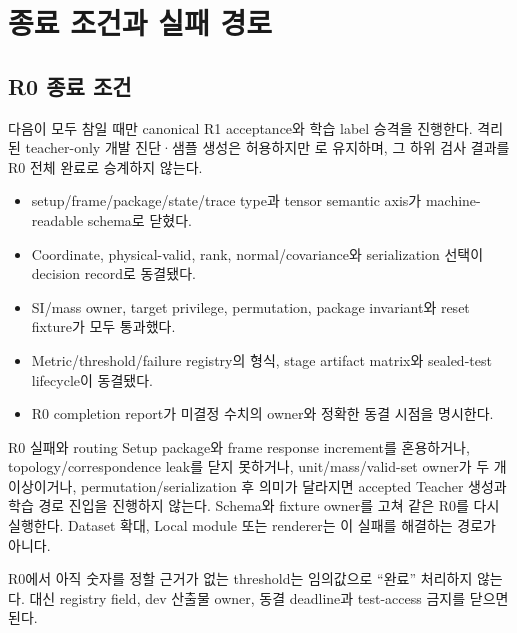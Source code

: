 \documentclass[10pt]{article}
\begin{document}
\section{종료 조건과 실패 경로}
\label{sec:r0-chapter-8}

\subsection{R0 종료 조건}

다음이 모두 참일 때만 canonical R1 acceptance와 학습 label 승격을 진행한다.
격리된 teacher-only 개발 진단·샘플 생성은 허용하지만 로 유지하며,
그 하위 검사 결과를 R0 전체 완료로 승계하지 않는다.
\begin{itemize}
  \item[$\square$] setup/frame/package/state/trace type과 tensor semantic axis가 machine-readable schema로 닫혔다.
  \item[$\square$] Coordinate, physical-valid, rank, normal/covariance와 serialization 선택이 decision record로 동결됐다.
  \item[$\square$] SI/mass owner, target privilege, permutation, package invariant와 reset fixture가 모두 통과했다.
  \item[$\square$] Metric/threshold/failure registry의 형식, stage artifact matrix와 sealed-test lifecycle이 동결됐다.
  \item[$\square$] R0 completion report가 미결정 수치의 owner와 정확한 동결 시점을 명시한다.
\end{itemize}

\begin{stopbox}{R0 실패와 routing}
Setup package와 frame response increment를 혼용하거나, topology/correspondence leak를 닫지 못하거나,
unit/mass/valid-set owner가 두 개 이상이거나, permutation/serialization 후 의미가 달라지면
accepted Teacher 생성과 학습 경로 진입을 진행하지 않는다. Schema와 fixture owner를 고쳐 같은 R0를 다시 실행한다.
Dataset 확대, Local module 또는 renderer는 이 실패를 해결하는 경로가 아니다.
\end{stopbox}

R0에서 아직 숫자를 정할 근거가 없는 threshold는 임의값으로 ``완료'' 처리하지 않는다.
대신 registry field, dev 산출물 owner, 동결 deadline과 test-access 금지를 닫으면 된다.
\end{document}
